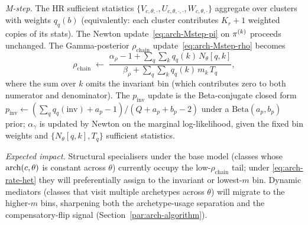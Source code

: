 \emph{M-step.} The HR sufficient statistics
$\{V_{c, \theta, \cdot}, U_{c, \theta, \cdot, \cdot}, W_{c, \theta, \cdot}\}$
aggregate over clusters with weights $q_q(b)$ (equivalently: each
cluster contributes $K_r + 1$ weighted copies of its stats). The
Newton update~\eqref{eq:arch-Mstep-pi} on $\pi^{(k)}$ proceeds
unchanged. The Gamma-posterior $\rho_{\text{chain}}$
update~\eqref{eq:arch-Mstep-rho} becomes
\begin{equation}
  \rho_{\text{chain}} \;\leftarrow\;
    \frac{\alpha_\rho - 1 + \sum_q \sum_k q_q(k)\, N_\theta[q, k]}
         {\beta_\rho + \sum_q \sum_k q_q(k)\, m_k\, T_q},
  \label{eq:arch-Mstep-rho-het}
\end{equation}
where the sum over $k$ omits the invariant bin (which contributes zero
to both numerator and denominator). The $p_{\text{inv}}$ update is the
Beta-conjugate closed form
$p_{\text{inv}} \leftarrow (\sum_q q_q(\mathrm{inv}) + a_p - 1) /
(Q + a_p + b_p - 2)$
under a $\mathrm{Beta}(a_p, b_p)$ prior; $\alpha_\gamma$ is updated by
Newton on the marginal log-likelihood, given the fixed bin weights and
$\{N_\theta[q, k], T_q\}$ sufficient statistics.

\emph{Expected impact.} Structural specialisers under the base model
(classes whose $\mathrm{arch}(c, \theta)$ is constant across $\theta$) currently
occupy the low-$\rho_{\text{chain}}$ tail; under
\eqref{eq:arch-rate-het} they will preferentially assign to the
invariant or lowest-$m$ bin. Dynamic mediators (classes that visit
multiple archetypes across $\theta$) will migrate to the higher-$m$
bins, sharpening both the archetype-usage separation and the
compensatory-flip signal (Section~\ref{par:arch-algorithm}).

